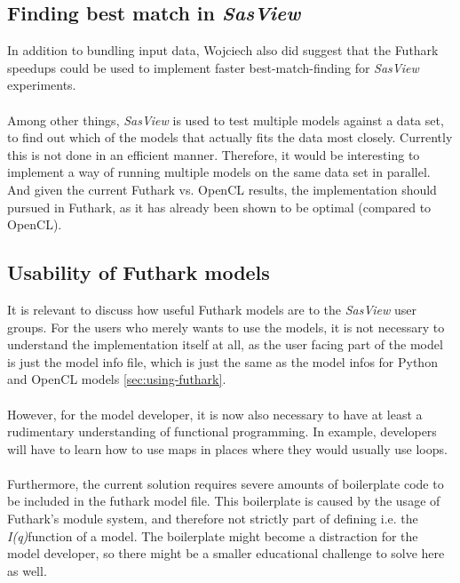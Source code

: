 \documentclass[11pt]{article}
\newcommand{\sasview}{\textit{SasView}}
\newcommand{\iq}{\textit{I(q)}}
\begin{document}
\subsection{Finding best match in \sasview}
\label{sec:best-match}
In addition to bundling input data, Wojciech also did suggest that the Futhark
speedups could be used to implement faster best-match-finding for \sasview
experiments.
\\\\
Among other things, \sasview{} is used to test multiple models against a data set,
to find out which of the models that actually fits the data most closely.
Currently this is not done in an efficient manner.
Therefore, it would be interesting to implement a way of running multiple models
on the same data set in parallel.
And given the current Futhark vs. OpenCL results, the implementation should
pursued in Futhark, as it has already been shown to be optimal
(compared to OpenCL).


\subsection{Usability of Futhark models}
It is relevant to discuss how useful Futhark models are to the \sasview{} user
groups. For the users who merely wants to use the models, it is not necessary
to understand the implementation itself at all, as the user facing part of
the model is just the model info file, which is just the same as the model infos
for Python and OpenCL models \ref{sec:using-futhark}.
\\\\
However, for the model developer, it is now also necessary to have at least a
rudimentary understanding of functional programming.
In example, developers will have to learn how to use maps in
places where they would usually use loops.
\\\\
Furthermore, the current solution requires severe amounts of boilerplate code to
be included in the futhark model file.
This boilerplate is caused by the usage of Futhark's module system, and
therefore not strictly part of defining i.e. the \iq function of a model.
The boilerplate might become a distraction for the model developer, so
there might be a smaller educational challenge to solve here as well.
\\\\
\end{document}
